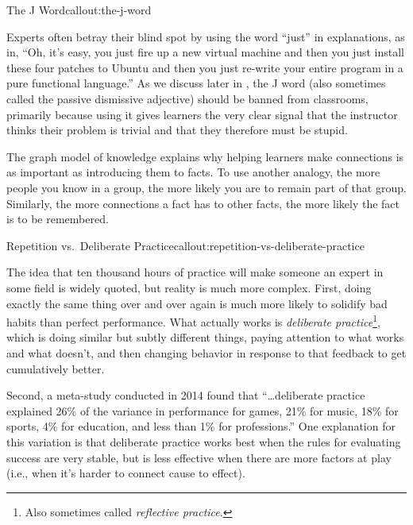 \begin{callout}{The J Word}{callout:the-j-word}

Experts often betray their blind spot by using the word ``just'' in
explanations, as in, ``Oh, it's easy, you just fire up a new virtual
machine and then you just install these four patches to Ubuntu and
then you just re-write your entire program in a pure functional
language.'' As we discuss later in , the J word
(also sometimes called the passive dismissive adjective) should be
banned from classrooms, primarily because using it gives learners the
very clear signal that the instructor thinks their problem is trivial
and that they therefore must be stupid.

\end{callout}

The graph model of knowledge explains why helping learners make
connections is as important as introducing them to facts.  To use
another analogy, the more people you know in a group, the more likely
you are to remain part of that group.  Similarly, the more connections
a fact has to other facts, the more likely the fact is to be
remembered.

\begin{callout}{Repetition vs.\ Deliberate Practice}{callout:repetition-vs-deliberate-practice}

The idea that ten thousand hours of practice will make someone an
expert in some field is widely quoted, but reality is much more
complex. First, doing exactly the same thing over and over again is
much more likely to solidify bad habits than perfect performance.
What actually works is \emph{deliberate practice}\footnote{Also
sometimes called \emph{reflective practice}.}, which is doing similar
but subtly different things, paying attention to what works and what
doesn't, and then changing behavior in response to that feedback to
get cumulatively better.

Second, a meta-study conducted in 2014 \cite{fixme} found that
``{\ldots}deliberate practice explained 26\% of the variance in
performance for games, 21\% for music, 18\% for sports, 4\% for
education, and less than 1\% for professions.'' One explanation for
this variation is that deliberate practice works best when the rules
for evaluating success are very stable, but is less effective when
there are more factors at play (i.e., when it's harder to connect
cause to effect).

\end{callout}

